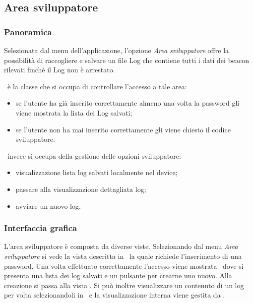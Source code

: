 \documentclass[../Funzionalita.tex]{subfiles}
\begin{document}
\subsection{Area sviluppatore}
\label{subsec:AreaSviluppatore}
	
	\subsubsection{Panoramica}
		Selezionata dal menu dell'applicazione, l'opzione \textit{Area sviluppatore} offre la possibilità di raccogliere e salvare un file Log che contiene tutti i dati dei \gls{beacon} rilevati finché il Log non è arrestato.
		
		\MainDeveloperPresenter\ è la classe che si occupa di controllare l'accesso a tale area:
		\begin{itemize}
			\item se l'utente ha già inserito correttamente almeno una volta la password gli viene mostrata la lista dei Log salvati;
			\item se l'utente non ha mai inserito correttamente gli viene chiesto il codice sviluppatore.
		\end{itemize}
		
		\MainDeveloperActivity\ invece si occupa della gestione delle opzioni sviluppatore:
		\begin{itemize}
			\item visualizzazione lista log salvati localmente nel device;
			\item passare alla visualizzazione dettagliata log;
			\item avviare un nuovo log.
		\end{itemize}
			

	\subsubsection{Interfaccia grafica}
		L'area sviluppatore è composta da diverse viste. Selezionando dal menu \textit{Area sviluppatore} si vede la vista descritta in \DeveloperUnlockerView\ la quale richiede l'inserimento di una password. Una volta effettuato correttamente l'accesso viene mostrata \MainDeveloperView\ dove si presenta una lista dei log salvati e un pulsante per crearne uno nuovo. Alla creazione si passa alla vista \LoggingView. Si può inoltre visualizzare un contenuto di un log per volta selezionandoli in \MainDeveloperView\ e la visualizzazione interna viene gestita da \LogInformationView.
		
\end{document}
